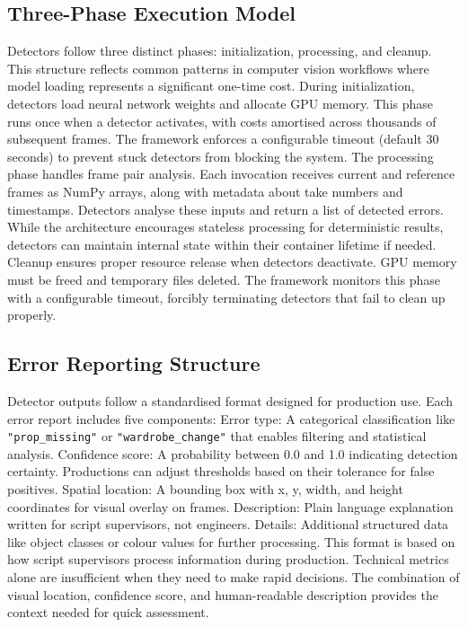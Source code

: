 \subsection{Three-Phase Execution Model}
Detectors follow three distinct phases: initialization, processing, and cleanup. This structure reflects common patterns in computer vision workflows where model loading represents a significant one-time cost.
During initialization, detectors load neural network weights and allocate GPU memory. This phase runs once when a detector activates, with costs amortised across thousands of subsequent frames. The framework enforces a configurable timeout (default 30 seconds) to prevent stuck detectors from blocking the system.
The processing phase handles frame pair analysis. Each invocation receives current and reference frames as NumPy arrays, along with metadata about take numbers and timestamps. Detectors analyse these inputs and return a list of detected errors. While the architecture encourages stateless processing for deterministic results, detectors can maintain internal state within their container lifetime if needed.
Cleanup ensures proper resource release when detectors deactivate. GPU memory must be freed and temporary files deleted. The framework monitors this phase with a configurable timeout, forcibly terminating detectors that fail to clean up properly.
\subsection{Error Reporting Structure}
Detector outputs follow a standardised format designed for production use. Each error report includes five components:
Error type: A categorical classification like \texttt{"prop\_missing"} or \texttt{"wardrobe\_change"} that enables filtering and statistical analysis.
Confidence score: A probability between 0.0 and 1.0 indicating detection certainty. Productions can adjust thresholds based on their tolerance for false positives.
Spatial location: A bounding box with x, y, width, and height coordinates for visual overlay on frames.
Description: Plain language explanation written for script supervisors, not engineers.
Details: Additional structured data like object classes or colour values for further processing.
This format is based on how script supervisors process information during production. Technical metrics alone are insufficient when they need to make rapid decisions. The combination of visual location, confidence score, and human-readable description provides the context needed for quick assessment.
